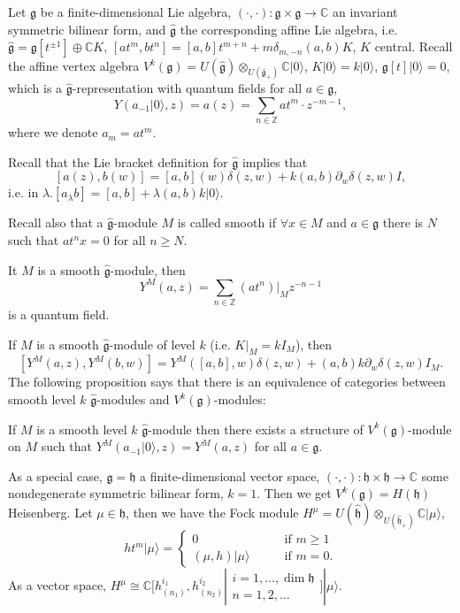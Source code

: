 \medskip\noindent
Let $\mathfrak{g}$ be a finite-dimensional
Lie algebra,
$(\cdot,\cdot):\mathfrak{g} \times
\mathfrak{g} \to \mathbb{C}$
an invariant symmetric bilinear form, and
$\hat{\mathfrak{g}}$ the
corresponding affine Lie algebra, i.e.
$\hat{\mathfrak{g}}=\mathfrak{g}[t^{\pm 1}]
\oplus \mathbb{C}K$,
$[at^m,bt^n]=[a,b]t^{m+n}+m\delta_{m,-n}(a,b)
K$,
$K$ central.
Recall the affine vertex algebra
$V^k(\mathfrak{g})=U(\hat{\mathfrak{g}})
\otimes_{U(\hat{\mathfrak{g}}_+)}
\mathbb{C}|0\rangle$,
$K |0\rangle=k |0\rangle$,
$\mathfrak{g}[t]|0\rangle=0$,
which is a
$\hat{\mathfrak{g}}$-representation with
quantum fields
for all $a \in \mathfrak{g}$,
$$
Y(a_{-1}|0\rangle,z)=a(z)=\sum_{n \in
\mathbb{Z}}at^m \cdot z^{-m-1},
$$
where we denote $a_m=at^m$.

Recall that the Lie bracket definition for
$\hat{\mathfrak{g}}$ implies that
$$
[a(z),b(w)]=[a,b](w)\delta(z,w)+k(a,b)
\partial_w\delta(z,w)I,
$$
i.e. in $\lambda$.$[a_\lambda
b]=[a,b]+\lambda(a,b)k|0\rangle$.

Recall also that a
$\hat{\mathfrak{g}}$-module $M$ is called
smooth if $\forall x \in M$ and $a \in
\mathfrak{g}$ there
is $N$ such that $at^n x=0$ for all $n \geq
N$.

It $M$ is a smooth
$\hat{\mathfrak{g}}$-module,
then
$$
Y^M(a,z)=\sum_{n \in
\mathbb{Z}}(at^n)|_{M}z^{-n-1}
$$
is a quantum field.

If $M$ is a smooth
$\hat{\mathfrak{g}}$-module of level $k$
(i.e. $K|_{M}=k I_M$), then
$$
[Y^M(a,z),Y^M(b,w)]
=Y^M([a,b],w)\delta(z,w)+(a,b)k\partial_w
\delta(z,w)I_M.
$$
The following proposition says that there is
an equivalence of
categories between smooth level $k$
$\hat{\mathfrak{g}}$-modules
and $V^k(\mathfrak{g})$-modules:

\begin{proposition}
\label{proposition-equivalence-vmods}
If $M$ is a smooth level $k$
$\hat{\mathfrak{g}}$-module
then there exists a structure of
$V^k(\mathfrak{g})$-module on $M$
such that $Y^M(a_{-1}|0\rangle,z)=Y^M(a,z)$
for all $a \in \mathfrak{g}$.
\end{proposition}

\noindent
As a special case,
$\mathfrak{g}=\mathfrak{h}$ a
finite-dimensional
vector space,
$(\cdot,\cdot):\mathfrak{h}\times\mathfrak{h}
\to\mathbb{C}$
some nondegenerate symmetric bilinear form,
$k=1$.
Then we get
$V^k(\mathfrak{g})=H(\mathfrak{h})$
Heisenberg.
Let $\mu \in \mathfrak{h}$, then we have the
Fock module
$H^\mu =
U(\hat{\mathfrak{h}})
\otimes_{U(\hat{\mathfrak{h}}_+)}\mathbb{C}
|\mu\rangle$,
$$
ht^m|\mu\rangle=\begin{cases}
0\qquad &\text{if }m\geq 1 \\
(\mu,h)|\mu\rangle\qquad &\text{if }m=0.
\end{cases}
$$
As a vector space,
$H^\mu\cong\mathbb{C}[h^{i_1}_{(n_1)},h^{i_2}
_{(n_2)}|
\substack{i=1,\ldots,\dim \mathfrak{h} \\
n=1,2,\ldots}]|\mu\rangle$.


